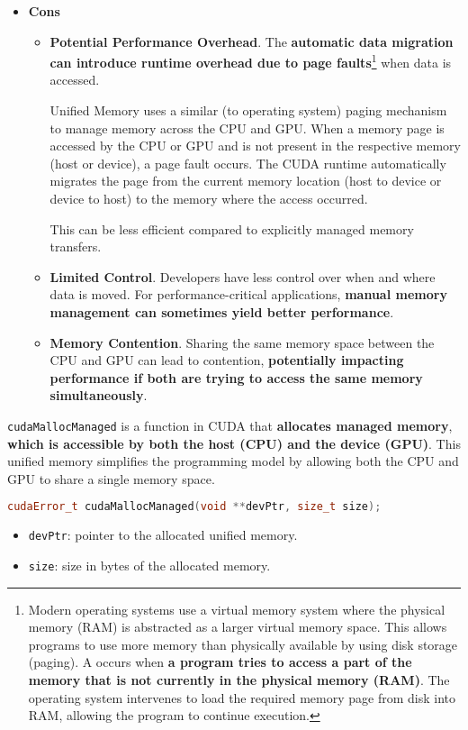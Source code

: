 \begin{itemize}
    \item[\textcolor{Red2}{\faIcon{times-circle}}] \textcolor{Red2}{\textbf{Cons}}
    \begin{itemize}
        \item[\textcolor{Red2}{\faIcon{times}}] \textcolor{Red2}{\textbf{Potential Performance Overhead}}. The \textbf{automatic data migration can introduce runtime overhead due to page faults}\footnote{
            Modern operating systems use a virtual memory system where the physical memory (RAM) is abstracted as a larger virtual memory space. This allows programs to use more memory than physically available by using disk storage (paging). A  occurs when \textbf{a program tries to access a part of the memory that is not currently in the physical memory (RAM)}. The operating system intervenes to load the required memory page from disk into RAM, allowing the program to continue execution.
        } when data is accessed. 
        
        Unified Memory uses a similar (to operating system) paging mechanism to manage memory across the CPU and GPU. When a memory page is accessed by the CPU or GPU and is not present in the respective memory (host or device), a page fault occurs. The CUDA runtime automatically migrates the page from the current memory location (host to device or device to host) to the memory where the access occurred.

        This can be less efficient compared to explicitly managed memory transfers.
        
        \item[\textcolor{Red2}{\faIcon{times}}] \textcolor{Red2}{\textbf{Limited Control}}. Developers have less control over when and where data is moved. For performance-critical applications, \textbf{manual memory management can sometimes yield better performance}.
        
        \item[\textcolor{Red2}{\faIcon{times}}] \textcolor{Red2}{\textbf{Memory Contention}}. Sharing the same memory space between the CPU and GPU can lead to contention, \textbf{potentially impacting performance if both are trying to access the same memory simultaneously}.
    \end{itemize}
\end{itemize}

\newpage

\noindent
\texttt{cudaMallocManaged} is a function in CUDA that \textbf{allocates managed memory}, \textbf{which is accessible by both the host (CPU) and the device (GPU)}. This unified memory simplifies the programming model by allowing both the CPU and GPU to share a single memory space.
\begin{lstlisting}[language=C++]
cudaError_t cudaMallocManaged(void **devPtr, size_t size);  
\end{lstlisting}
\begin{itemize}
    \item \texttt{devPtr}: pointer to the allocated unified memory.
    \item \texttt{size}: size in bytes of the allocated memory.
\end{itemize}

